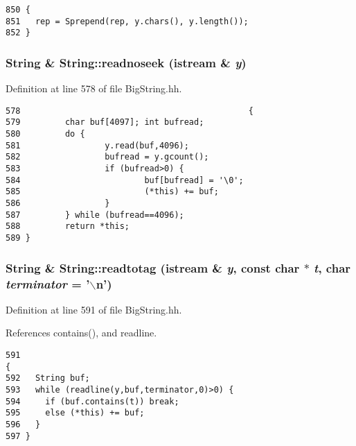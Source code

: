 \footnotesize\begin{verbatim}850 {
851   rep = Sprepend(rep, y.chars(), y.length());
852 }
\end{verbatim}\normalsize 
{}
\subsubsection{\setlength{\rightskip}{0pt plus 5cm}String \& String::readnoseek (istream \& {\em y})\hspace{0.3cm}{\tt  [inline]}}\label{classString_a15}




Definition at line 578 of file Big\-String.hh.



\footnotesize\begin{verbatim}578                                              {
579         char buf[4097]; int bufread;
580         do {
581                 y.read(buf,4096);
582                 bufread = y.gcount();
583                 if (bufread>0) {
584                         buf[bufread] = '\0';
585                         (*this) += buf;
586                 }
587         } while (bufread==4096);
588         return *this;
589 }
\end{verbatim}\normalsize 
{}
\subsubsection{\setlength{\rightskip}{0pt plus 5cm}String \& String::readtotag (istream \& {\em y}, const char $\ast$ {\em t}, char {\em terminator} = '$\backslash$n')\hspace{0.3cm}{\tt  [inline]}}\label{classString_a16}




Definition at line 591 of file Big\-String.hh.

References contains(), and readline.



\footnotesize\begin{verbatim}591                                                                                     {
592   String buf;
593   while (readline(y,buf,terminator,0)>0) {
594     if (buf.contains(t)) break;
595     else (*this) += buf;
596   }
597 }
\end{verbatim}\normalsize 
{}
